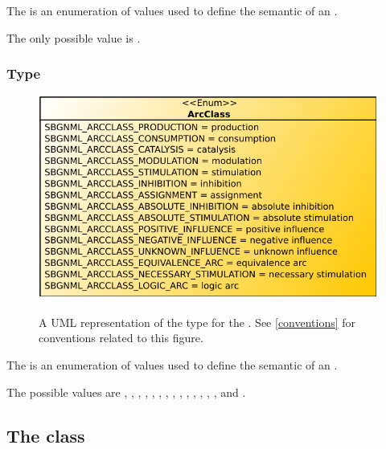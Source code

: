The  is an enumeration of values used to define the semantic of an \ArcGroup. 

The only possible value is .

\subsubsection{Type \fixttspace{}}

\begin{figure}[ht!]
  \centering
  \includegraphics[scale=0.7]{figures/sbgnml_type_enum_arcclass_uml.pdf}\\
\caption{A UML representation of the \ArcClass type for the
\SbgnmlPackage. See \ref{conventions} for conventions related to this
figure. }
  \label{fig:sbgnml_type_enum_arcclass_uml}
\end{figure}


The  is an enumeration of values used to define the semantic of an \Arc. 


The possible values are , ,
, , ,
, , ,
, ,
, ,
, , and .

\subsection{The  class}
\label{document-class}

